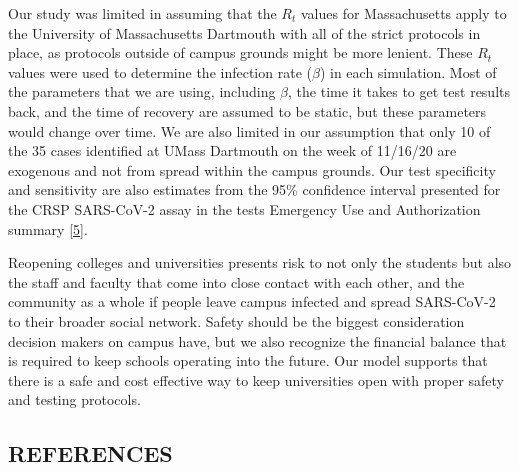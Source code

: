\documentclass[fullpage]{extarticle}
\begin{document}
\begin{large}
\begin{flushleft}
Our study was limited in assuming that the $R_t$ values for Massachusetts apply to the University of Massachusetts Dartmouth with all of the strict protocols in place, as protocols outside of campus grounds might be more lenient. These $R_t$ values were used to determine the infection rate ($\beta$) in each simulation. Most of the parameters that we are using, including $\beta$, the time it takes to get test results back, and the time of recovery are assumed to be static, but these parameters would change over time. We are also limited in our assumption that only 10 of the 35 cases identified at UMass Dartmouth on the week of 11/16/20 are exogenous and not from spread within the campus grounds. Our test specificity and sensitivity are also estimates from the 95\% confidence interval presented for the CRSP SARS-CoV-2 assay in the tests Emergency Use and Authorization summary [\hyperref[ref:5]{5}].\bigbreak

Reopening colleges and universities presents risk to not only the students but also the staff and faculty that come into close contact with each other, and the community as a whole if people leave campus infected and spread SARS-CoV-2 to their broader social network. Safety should be the biggest consideration decision makers on campus have, but we also recognize the financial balance that is required to keep schools operating into the future. Our model supports that there is a safe and cost effective way to keep universities open with proper safety and testing protocols.

\end{flushleft}
\end{large}
\pagebreak

\begin{center}
\section*{REFERENCES}
\label{sec:ref}
\end{center}
\end{document}

